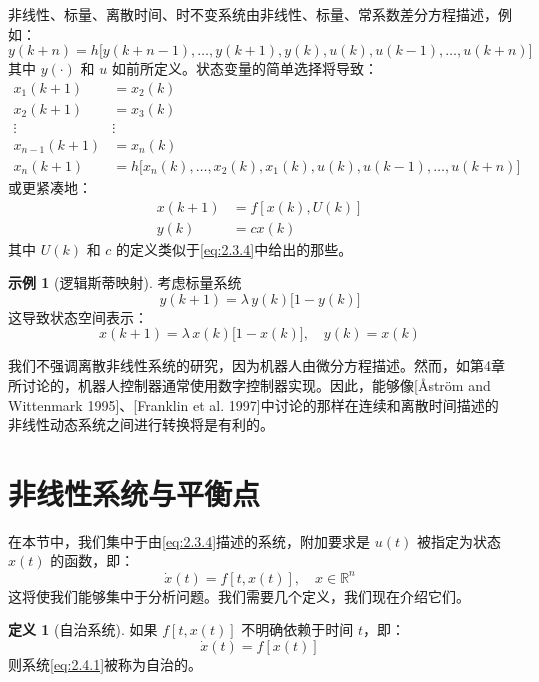 \documentclass[UTF8,12pt,a4paper]{ctexart}
\theoremstyle{definition}
\newtheorem{definition}{定义}[section]
\newtheorem{example}{示例}[section]
\begin{document}
非线性、标量、离散时间、时不变系统由非线性、标量、常系数差分方程描述，例如：
\begin{equation}\label{eq:2.3.6}
y(k+n) = h\bigl[y(k+n-1), \ldots, y(k+1), y(k), u(k), u(k-1), \ldots, u(k+n)\bigr]
\end{equation}
其中 $y(\cdot)$ 和 $u$ 如前所定义。状态变量的简单选择将导致：
\begin{equation}\label{eq:2.3.7}
\begin{aligned}
x_1(k+1) &= x_2(k) \\
x_2(k+1) &= x_3(k) \\
\vdots & \vdots \\
x_{n-1}(k+1) &= x_n(k) \\
x_n(k+1) &= h\bigl[x_n(k), \ldots, x_2(k), x_1(k), u(k), u(k-1), \ldots, u(k+n)\bigr]
\end{aligned}
\end{equation}
或更紧凑地：
\begin{equation}\label{eq:2.3.8}
\begin{aligned}
x(k+1) &= f[x(k), U(k)] \\
y(k) &= cx(k)
\end{aligned}
\end{equation}
其中 $U(k)$ 和 $c$ 的定义类似于\eqref{eq:2.3.4}中给出的那些。

\begin{example}[逻辑斯蒂映射]
考虑标量系统
\[
y(k+1) = \lambda\, y(k)\bigl[1 - y(k)\bigr]
\]
这导致状态空间表示：
\[
x(k+1) = \lambda\, x(k)\bigl[1 - x(k)\bigr], \quad y(k) = x(k)
\]
\end{example}

我们不强调离散非线性系统的研究，因为机器人由微分方程描述。然而，如第4章所讨论的，机器人控制器通常使用数字控制器实现。因此，能够像[Åström and Wittenmark 1995]、[Franklin et al. 1997]中讨论的那样在连续和离散时间描述的非线性动态系统之间进行转换将是有利的。

\section{非线性系统与平衡点}

在本节中，我们集中于由\eqref{eq:2.3.4}描述的系统，附加要求是 $u(t)$ 被指定为状态 $x(t)$ 的函数，即：
\begin{equation}\label{eq:2.4.1}
\dot{x}(t) = f[t, x(t)], \quad x \in \mathbb{R}^n
\end{equation}
这将使我们能够集中于分析问题。我们需要几个定义，我们现在介绍它们。

\begin{definition}[自治系统]
如果 $f[t, x(t)]$ 不明确依赖于时间 $t$，即：
\[
\dot{x}(t) = f[x(t)]
\]
则系统\eqref{eq:2.4.1}被称为自治的。
\end{definition}
\end{document}
